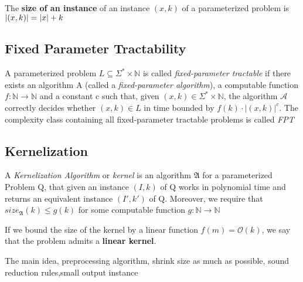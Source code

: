\begin{definition}
    The \textbf{size of an instance} of an instance $(x,k)$ of a parameterized problem is $\abs{(x,k)} = \abs{x} + k$
\end{definition}

\subsection{Fixed Parameter Tractability}

\begin{definition} 
    A parameterized problem $L\subseteq\Sigma^*\times\mathbb{N}$ is called \textit{fixed-parameter tractable} if there exists an algorithm A (called a \textit{fixed-parameter algorithm}), a computable function $f:\mathbb{N} \rightarrow \mathbb{N}$ and a constant c such that, given $(x,k) \in \Sigma^* \times \mathbb{N}$, the algorithm $\mathcal{A}$ correctly decides whether $(x,k) \in L$ in time bounded by $f(k) \cdot |(x,k)|^c$. The complexity class containing all fixed-parameter tractable problems is called \textit{FPT}
\end{definition}


\subsection{Kernelization}

\begin{definition}
A \textit{Kernelization Algorithm} or \textit{kernel} is an algorithm $\mathfrak{A}$ for a parameterized Problem Q, that given an instance $(I,k)$ of Q works in polynomial time and returns an equivalent instance $(I', k')$ of Q. Moreover, we require that $size_{\mathfrak{A}}(k) \leq g(k)$ for some computable function $g:\mathbb{N} \rightarrow \mathbb{N}$
\end{definition}

If we bound the size of the kernel by a linear function $f(m) = \mathcal{O}(k)$, we say that the problem admits a \textbf{linear kernel}. 


The main idea, preprocessing algorithm, shrink size as much as possible, sound reduction rules,small output instance

